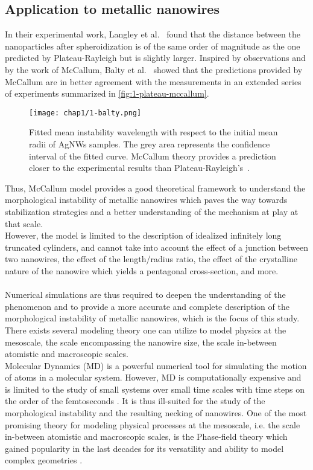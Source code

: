 \subsection{Application to metallic nanowires}
        In their experimental work, Langley et al.\ \cite{Langley2014} found that the distance between the nanoparticles after spheroidization is of the same order of magnitude as the one predicted by Plateau-Rayleigh but is slightly larger. Inspired by observations and by the work of McCallum, Balty et al.\ \cite{BaltyBaretSilhanekNguyen2024} showed that the predictions provided by McCallum are in better agreement with the measurements in an extended series of experiments summarized in \autoref{fig:1-plateau-mccallum}.
        \begin{figure}
                \centering
                \texttt{[image: chap1/1-balty.png]}
                \caption{Fitted mean instability wavelength with respect to the initial mean radii of AgNWs samples. The grey area represents the confidence interval of the fitted curve. McCallum theory provides a prediction closer to the experimental results than Plateau-Rayleigh's\ \cite{BaltyBaretSilhanekNguyen2024}.}
                \label{fig:1-plateau-mccallum}
        \end{figure}
        Thus, McCallum model provides a good theoretical framework to understand the morphological instability of metallic nanowires which paves the way towards stabilization strategies and a better understanding of the mechanism at play at that scale.\\
        However, the model is limited to the description of idealized infinitely long truncated cylinders, and cannot take into account the effect of a junction between two nanowires, the effect of the length/radius ratio, the effect of the crystalline nature of the nanowire which yields a pentagonal cross-section, and more.\\\\
        Numerical simulations are thus required to deepen the understanding of the phenomenon and to provide a more accurate and complete description of the morphological instability of metallic nanowires, which is the focus of this study. There exists several modeling theory one can utilize to model physics at the mesoscale, the scale encompassing the nanowire size, the scale in-between atomistic and macroscopic scales.\\
        Molecular Dynamics (MD) is a powerful numerical tool for simulating the motion of atoms in a molecular system. However, MD is computationally expensive and is limited to the study of small systems over small time scales with time steps on the order of the femtoseconds \cite{Tuckerman2000}. It is thus ill-suited for the study of the morphological instability and the resulting necking of nanowires.
        One of the most promising theory for modeling physical processes at the mesoscale, i.e. the scale in-between atomistic and macroscopic scales, is the Phase-field theory which gained popularity in the last decades for its versatility and ability to model complex geometries \cite{BartelsMosler2015}.